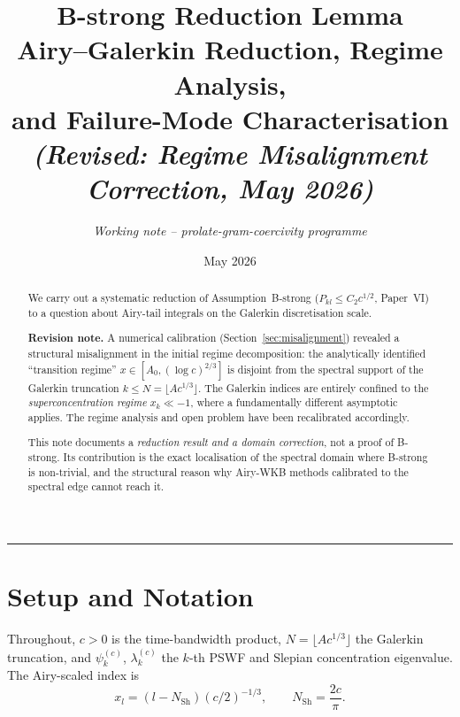 \documentclass[12pt,a4paper]{article}
\title{%
  \textbf{B-strong Reduction Lemma}\\[0.4em]
  \large Airy--Galerkin Reduction, Regime Analysis,\\
  and Failure-Mode Characterisation\\
  \normalsize\textit{(Revised: Regime Misalignment Correction, May 2026)}
}
\author{\textit{Working note -- prolate-gram-coercivity programme}}
\date{May 2026}
\newcommand{\lam}[1]{\lambda_{#1}^{(c)}}
\newcommand{\pswf}[1]{\psi_{#1}^{(c)}}
\begin{document}
\maketitle

\begin{abstract}
We carry out a systematic reduction of Assumption~B-strong
($P_{kl} \leq C_2 c^{1/2}$, Paper~VI) to a question about
Airy-tail integrals on the Galerkin discretisation scale.

\medskip\noindent
\textbf{Revision note.}
A numerical calibration (Section~\ref{sec:misalignment}) revealed
a structural misalignment in the initial regime decomposition:
the analytically identified ``transition regime''
$x \in [A_0, (\log c)^{2/3}]$ is disjoint from the
spectral support of the Galerkin truncation $k \leq N = \lfloor Ac^{1/3}\rfloor$.
The Galerkin indices are entirely confined to the
\emph{superconcentration regime} $x_k \ll -1$,
where a fundamentally different asymptotic applies.
The regime analysis and open problem have been
recalibrated accordingly.

\medskip\noindent
This note documents a \emph{reduction result and a domain
correction}, not a proof of B-strong.
Its contribution is the exact localisation of the
spectral domain where B-strong is non-trivial,
and the structural reason why Airy-WKB methods calibrated
to the spectral edge cannot reach it.
\end{abstract}

\tableofcontents
\bigskip\hrule\bigskip

\section{Setup and Notation}

Throughout, $c > 0$ is the time-bandwidth product,
$N = \lfloor Ac^{1/3} \rfloor$ the Galerkin truncation,
and $\pswf{k}$, $\lam{k}$ the $k$-th PSWF and Slepian
concentration eigenvalue.
The Airy-scaled index is
\[
  x_l = (l - N_{\mathrm{Sh}})(c/2)^{-1/3},
  \qquad N_{\mathrm{Sh}} = \frac{2c}{\pi}.
\]
\end{document}
